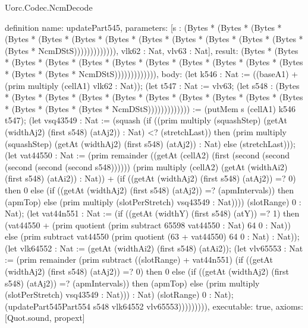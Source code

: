 \begin{lexlean}{Uorc.Codec.NcmDecode}
\begin{semanticmodule}
definition{
  name: updatePart545,
  parameters: [s : (Bytes * (Bytes * (Bytes * (Bytes * (Bytes * (Bytes * (Bytes * (Bytes * (Bytes * (Bytes * (Bytes * (Bytes * (Bytes * NcmDStS))))))))))))), vlk62 : Nat, vlv63 : Nat],
  result: (Bytes * (Bytes * (Bytes * (Bytes * (Bytes * (Bytes * (Bytes * (Bytes * (Bytes * (Bytes * (Bytes * (Bytes * (Bytes * NcmDStS))))))))))))),
  body: (let k546 : Nat := ((baseA1) + (prim multiply (cellA1) vlk62 : Nat)); (let t547 : Nat := vlv63; (let s548 : (Bytes * (Bytes * (Bytes * (Bytes * (Bytes * (Bytes * (Bytes * (Bytes * (Bytes * (Bytes * (Bytes * (Bytes * (Bytes * NcmDStS))))))))))))) := (putMem s (cellA1) k546 t547); (let vsq43549 : Nat := (squash (if ((prim multiply (squashStep) (getAt (widthAj2) (first s548) (atAj2)) : Nat) <? (stretchLast)) then (prim multiply (squashStep) (getAt (widthAj2) (first s548) (atAj2)) : Nat) else (stretchLast))); (let vat44550 : Nat := (prim remainder ((getAt (cellA2) (first (second (second (second (second (second s548)))))) (prim multiply (cellA2) (getAt (widthAi2) (first s548) (atAi2)) : Nat)) + (if ((getAt (widthAj2) (first s548) (atAj2)) =? 0) then 0 else (if ((getAt (widthAj2) (first s548) (atAj2)) =? (apmIntervals)) then (apmTop) else (prim multiply (slotPerStretch) vsq43549 : Nat)))) (slotRange) 0 : Nat); (let vat44n551 : Nat := (if ((getAt (widthY) (first s548) (atY)) =? 1) then (vat44550 + (prim quotient (prim subtract 65598 vat44550 : Nat) 64 0 : Nat)) else (prim subtract vat44550 (prim quotient (63 + vat44550) 64 0 : Nat) : Nat)); (let vlk64552 : Nat := (getAt (widthAi2) (first s548) (atAi2)); (let vlv65553 : Nat := (prim remainder (prim subtract ((slotRange) + vat44n551) (if ((getAt (widthAj2) (first s548) (atAj2)) =? 0) then 0 else (if ((getAt (widthAj2) (first s548) (atAj2)) =? (apmIntervals)) then (apmTop) else (prim multiply (slotPerStretch) vsq43549 : Nat))) : Nat) (slotRange) 0 : Nat); (updatePart545Part554 s548 vlk64552 vlv65553))))))))),
  executable: true,
  axioms: [Quot.sound, propext]
}


\end{semanticmodule}
\end{lexlean}
